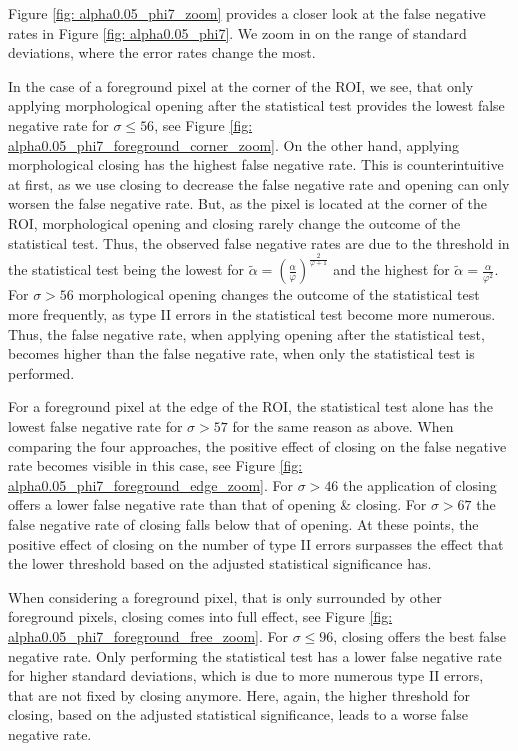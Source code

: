 \documentclass[a4paper,12pt]{article}
\theoremstyle{plain}
\theoremstyle{definition}
\numberwithin{equation}{section}
\begin{document}
Figure \ref{fig: alpha0.05_phi7_zoom} provides a closer look at the false negative rates in Figure \ref{fig: alpha0.05_phi7}. We zoom in on the range of standard deviations, where the error rates change the most.



In the case of a foreground pixel at the corner of the ROI, we see, that only applying morphological opening after the statistical test provides the lowest false negative rate for $\sigma \leq 56$, see Figure \ref{fig: alpha0.05_phi7_foreground_corner_zoom}. On the other hand, applying morphological closing has the highest false negative rate. This is counterintuitive at first, as we use closing to decrease the false negative rate and opening can only worsen the false negative rate. But, as the pixel is located at the corner of the ROI, morphological opening and closing rarely change the outcome of the statistical test. Thus, the observed false negative rates are due to the threshold in the statistical test being the lowest for $\tilde{\alpha} = \left( \frac{\alpha}{\varphi} \right)^{\frac{2}{\varphi + 1}}$ and the highest for $\tilde{\alpha} = \frac{\alpha}{\varphi^2}$. For $\sigma > 56$ morphological opening changes the outcome of the statistical test more frequently, as type II errors in the statistical test become more numerous. Thus, the false negative rate, when applying opening after the statistical test, becomes higher than the false negative rate, when only the statistical test is performed.

For a foreground pixel at the edge of the ROI, the statistical test alone has the lowest false negative rate for $\sigma > 57$ for the same reason as above. When comparing the four approaches, the positive effect of closing on the false negative rate becomes visible in this case, see Figure \ref{fig: alpha0.05_phi7_foreground_edge_zoom}. For $\sigma > 46$ the application of closing offers a lower false negative rate than that of opening \& closing. For $\sigma > 67$ the false negative rate of closing falls below that of opening. At these points, the positive effect of closing on the number of type II errors surpasses the effect that the lower threshold based on the adjusted statistical significance has.

When considering a foreground pixel, that is only surrounded by other foreground pixels, closing comes into full effect, see Figure \ref{fig: alpha0.05_phi7_foreground_free_zoom}. For $\sigma \leq 96$, closing offers the best false negative rate. Only performing the statistical test has a lower false negative rate for higher standard deviations, which is due to more numerous type II errors, that are not fixed by closing anymore. Here, again, the higher threshold for closing, based on the adjusted statistical significance, leads to a worse false negative rate.
\end{document}
